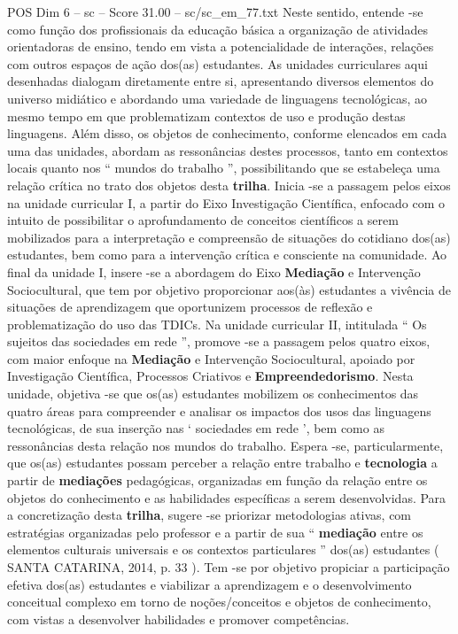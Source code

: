 \begin{textsample}{POS Dim 6 – sc – Score 31.00 – sc/sc\_em\_77.txt}
Neste sentido, entende -se como função dos profissionais da educação básica a organização de atividades orientadoras de ensino, tendo em vista a potencialidade de interações, relações com outros espaços de ação dos(as) estudantes.
As unidades curriculares aqui desenhadas dialogam diretamente entre si, apresentando diversos elementos do universo midiático e abordando uma variedade de linguagens tecnológicas, ao mesmo tempo em que problematizam contextos de uso e produção destas linguagens.
Além disso, os objetos de conhecimento, conforme elencados em cada uma das unidades, abordam as ressonâncias destes processos, tanto em contextos locais quanto nos “ mundos do trabalho ”, possibilitando que se estabeleça uma relação crítica no trato dos objetos desta \textbf{trilha}.
Inicia -se a passagem pelos eixos na unidade curricular I, a partir do Eixo Investigação Científica, enfocado com o intuito de possibilitar o aprofundamento de conceitos científicos a serem mobilizados para a interpretação e compreensão de situações do cotidiano dos(as) estudantes, bem como para a intervenção crítica e consciente na comunidade.
Ao final da unidade I, insere -se a abordagem do Eixo \textbf{Mediação} e Intervenção Sociocultural, que tem por objetivo proporcionar aos(às) estudantes a vivência de situações de aprendizagem que oportunizem processos de reflexão e problematização do uso das TDICs.
Na unidade curricular II, intitulada “ Os sujeitos das sociedades em rede ”, promove -se a passagem pelos quatro eixos, com maior enfoque na \textbf{Mediação} e Intervenção Sociocultural, apoiado por Investigação Científica, Processos Criativos e \textbf{Empreendedorismo}.
Nesta unidade, objetiva -se que os(as) estudantes mobilizem os conhecimentos das quatro áreas para compreender e analisar os impactos dos usos das linguagens tecnológicas, de sua inserção nas ‘ sociedades em rede ’, bem como as ressonâncias desta relação nos mundos do trabalho.
Espera -se, particularmente, que os(as) estudantes possam perceber a relação entre trabalho e \textbf{tecnologia} a partir de \textbf{mediações} pedagógicas, organizadas em função da relação entre os objetos do conhecimento e as habilidades específicas a serem desenvolvidas.
Para a concretização desta \textbf{trilha}, sugere -se priorizar metodologias ativas, com estratégias organizadas pelo professor e a partir de sua “ \textbf{mediação} entre os elementos culturais universais e os contextos particulares ” dos(as) estudantes ( SANTA CATARINA, 2014, p. 33 ).
Tem -se por objetivo propiciar a participação efetiva dos(as) estudantes e viabilizar a aprendizagem e o desenvolvimento conceitual complexo em torno de noções/conceitos e objetos de conhecimento, com vistas a desenvolver habilidades e promover competências.

\end{textsample}
